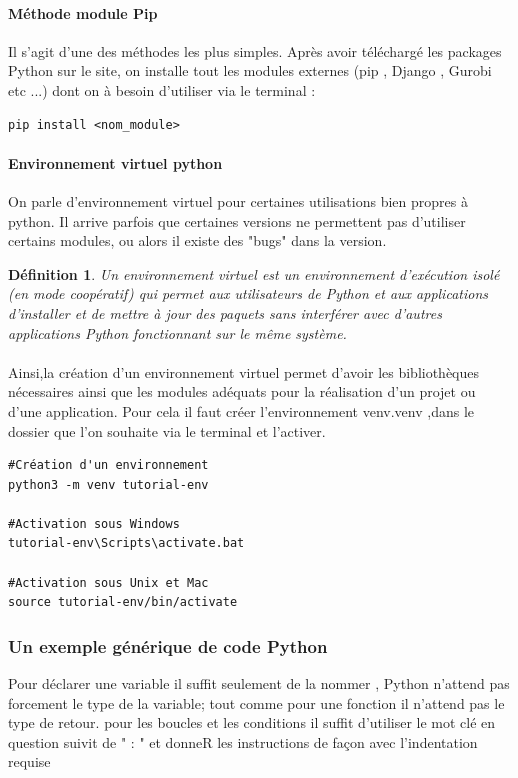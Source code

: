 \documentclass[a4paper, 12pt, twoside]{article}
\newtheorem{definition}{Définition}
\begin{document}
\paragraph{Méthode module Pip} {Il s'agit d'une des méthodes les plus simples.  Après avoir téléchargé les packages Python sur le site, on installe tout les modules externes (pip , Django , Gurobi etc ...)  dont on à besoin d'utiliser  via le terminal : }
\begin{verbatim}
pip install <nom_module>
\end{verbatim}

\paragraph{Environnement virtuel python}{On parle d'environnement virtuel pour certaines utilisations bien propres à \textsf{python}. Il arrive parfois que certaines versions ne permettent pas d'utiliser certains modules, ou alors il existe des "bugs" dans la version.}
\begin{definition}
Un environnement virtuel est un environnement d'exécution isolé (en mode coopératif) qui permet aux utilisateurs de Python et aux applications d'installer et de mettre à jour des paquets sans interférer avec d'autres applications Python fonctionnant sur le même système.
\end{definition}
\paragraph*{}{Ainsi,la création d'un environnement virtuel permet d'avoir les bibliothèques nécessaires ainsi que les modules adéquats pour la réalisation d'un projet ou d'une application. Pour cela il faut créer l'environnement \textsf{venv.venv} ,dans le dossier que l'on souhaite via le terminal et l'activer.}

\begin{verbatim}
#Création d'un environnement
python3 -m venv tutorial-env   

#Activation sous Windows
tutorial-env\Scripts\activate.bat

#Activation sous Unix et Mac
source tutorial-env/bin/activate
\end{verbatim}


\subsubsection{Un exemple générique de code Python}
Pour déclarer une variable il suffit seulement de la nommer , Python n'attend pas forcement le type de la variable; tout comme pour une fonction il n'attend pas le type de retour. pour les boucles et les conditions il suffit d'utiliser le mot clé en question suivit de " : " et donneR les instructions de façon avec l'indentation requise  \newline
\end{document}
